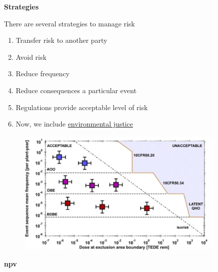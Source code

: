 \documentclass[aspectratio=1610,pdftex,dvipsnames,compress,xcolor={dvipsnames}]{beamer}
\newcommand{\acf}{\acrfull} %
\begin{document}
\begin{frame}[plain]{}
    \centering\LARGE\textbf{Strategies}
\end{frame}


\addtocounter{framenumber}{-1}
\begin{frame}{There are several strategies to manage risk}
    \begin{enumerate}[series=outerlist,topsep=0pt,itemsep=21pt,leftmargin=*,label=(\arabic*)]
        \item[]Transfer risk to another party
        \item[]Avoid risk
        \item[]Reduce frequency 
        \item[]Reduce consequences a particular event
        \item[]Regulations provide acceptable level of risk
        \item[]Now, we include \href{https://www.epa.gov/environmentaljustice}{environmental justice}
    \end{enumerate}
\end{frame}


\begin{frame}{}
    \begin{figure}
        \centering
        \includegraphics[width=0.90\textwidth]{farmer.jpg}
    \end{figure}
\end{frame}


\begin{frame}[plain]{}
    \centering\LARGE\textbf{\acf{npv}}
\end{frame}
\end{document}
